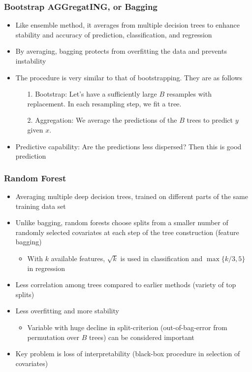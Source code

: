 \documentclass[aspectratio=169]{beamer}
\begin{document}
\begin{frame}
\frametitle{Bootstrap AGGregatING, or Bagging}
\begin{itemize}
\item Like ensemble method, it averages from multiple decision trees to enhance stability and accuracy of prediction, classification, and regression
\item By averaging, bagging protects from overfitting the data and prevents instability
\item The procedure is very similar to that of bootstrapping. They are as follows
\begin{itemize}
\item[1.] Bootstrap: Let's have a sufficiently large $B$ resamples with replacement. In each resampling step, we fit a tree.
\item[2.] Aggregation: We average the predictions of the $B$ trees to predict $y$ given $x$. 
\end{itemize}
\item Predictive capability: Are the predictions less dispersed? Then this is good prediction
\end{itemize}
\end{frame}


\begin{frame}
\frametitle{Random Forest}
\begin{itemize}
\item Averaging multiple deep decision trees, trained on different parts of the same training data set
\item  Unlike bagging, random forests choose splits from a smaller number of randomly selected covariates at each step of the tree construction (feature bagging)
\begin{itemize}
\item With $k$ available features, $\sqrt{k}$ is used in classification and $\max\{k/3,5\}$ in regression
\end{itemize}
\item Less correlation among trees compared to earlier methods (variety of top splits)
\item Less overfitting and more stability
\begin{itemize}
\item Variable with huge decline in split-criterion (out-of-bag-error from permutation over $B$ trees) can be considered important
\end{itemize}
\item Key problem is loss of interpretability (black-box procedure in selection of covariates)
\end{itemize}
\end{frame}
\end{document}
